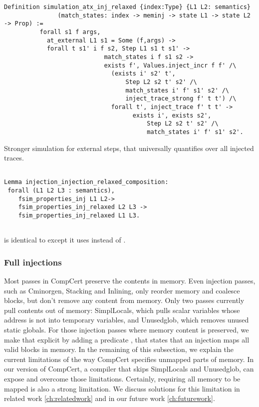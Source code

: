 \begin{table}\label{fig:simulation_atxX}
\begin{lstlisting}
Definition simulation_atx_inj_relaxed {index:Type} {L1 L2: semantics}
               (match_states: index -> meminj -> state L1 -> state L2 -> Prop) :=
          forall s1 f args,
            at_external L1 s1 = Some (f,args) -> 
            forall t s1' i f s2, Step L1 s1 t s1' ->
                            match_states i f s1 s2 ->
                            exists f', Values.inject_incr f f' /\
                              (exists i' s2' t',
                                  Step L2 s2 t' s2' /\
                                  match_states i' f' s1' s2' /\
                                  inject_trace_strong f' t t') /\
                              forall t', inject_trace f' t t' ->
                              		exists i', exists s2',
                                    	Step L2 s2 t' s2' /\
                                    	match_states i' f' s1' s2'.
\end{lstlisting}
Stronger simulation for external steps, that universally quantifies over all injected traces. 
\end{table}
\begin{table}
\begin{lstlisting}
	
Lemma injection_injection_relaxed_composition:
 forall (L1 L2 L3 : semantics),
    fsim_properties_inj L1 L2->
    fsim_properties_inj_relaxed L2 L3 ->
    fsim_properties_inj_relaxed L1 L3.
    
\end{lstlisting}
\caption{ is identical to  except it uses  instead of .}
\end{table}
   
   
\subsubsection{Full injections} Most passes in CompCert preserve the contents in memory. Even injection passes, such as Cminorgen, Stacking and Inlining, only reorder memory and coalesce blocks, but don't remove any content from memory. Only two passes currently pull contents out of memory: SimplLocals, which pulls scalar variables whose address is not into temporary variables, and Unusedglob, which removes unused static globals. For those injection passes where memory content is preserved, we make that explicit by adding a predicate , that states that an injection maps all valid blocks in memory. In the remaining of this subsection, we explain the current limitations of the way CompCert specifies unmapped parts of memory. In our version of CompCert, a compiler that skips SimplLocals and Unusedglob, can expose  and overcome those limitations. Certainly, requiring all memory to be mapped is also a strong limitation. We discuss solutions for this limitation in related work \ref{ch:relatedwork} and in our future work \ref{ch:futurework}.

